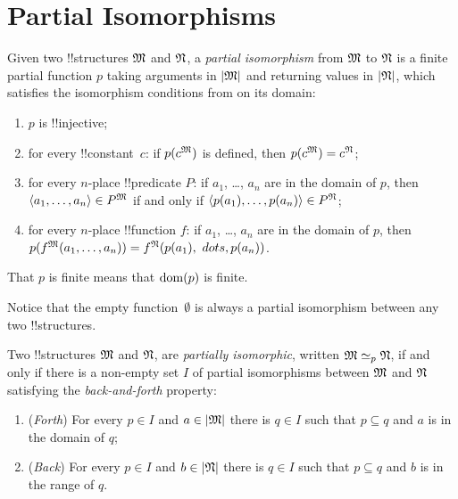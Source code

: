 \documentclass[../../../include/open-logic-section]{subfiles}
\begin{document}
\section{Partial Isomorphisms}

\begin{defn}
  Given two !!{structure}s $\mathfrak M$ and $\mathfrak N$, a
  \emph{partial isomorphism} from $\mathfrak M$ to $\mathfrak N$ is a
  finite partial function $p$ taking arguments in $\left| \mathfrak M \right|$ and returning
  values in $\left| \mathfrak N \right|$, which satisfies the isomorphism conditions from
   on its domain:
  \begin{enumerate}
  \item $p$ is !!{injective};
  \item for every !!{constant}~$c$: if $p(c^{\mathfrak M})$ is defined,
    then $p(c^{\mathfrak M}) = c^{\mathfrak N}$;
  \item for every $n$-place !!{predicate} $P$: if $a_1$, \dots, $a_n$
    are in the domain of $p$, then $\langle a_1, \dots, a_n\rangle \in
    P^{\mathfrak M}$ if and only if $\langle p(a_1), \dots, p(a_n) \rangle
    \in P^{\mathfrak N}$;
  \item for every $n$-place !!{function} $f$: if $a_1$, \dots, $a_n$
    are in the domain of $p$, then $p(f^{\mathfrak M} (a_1, \dots,a_n))
    = f^{\mathfrak N} (p(a_1), \ dots, p(a_n))$.
  \end{enumerate}
  That $p$ is finite means that $\mathrm{dom}(p)$ is finite.
\end{defn}

Notice that the empty function~$\emptyset$ is always a partial
isomorphism between any two !!{structure}s.

\begin{defn}
  Two !!{structure}s $\mathfrak M$ and $\mathfrak N$, are
  \emph{partially isomorphic}, written $\Struct{M} \iso[p]
  \Struct{N}$, if and only if there is a non-empty set $I$
  of partial isomorphisms between $\mathfrak M$ and $\mathfrak N$
  satisfying the \emph{back-and-forth} property:
  \begin{enumerate}
  \item (\emph{Forth}) For every $p \in I$ and $a \in \left| \mathfrak M \right|$
    there is $q \in I$ such that $p \subseteq q$ and $a$ is
    in the domain of $q$;
  \item (\emph{Back}) For every $p \in I$ and $b \in \left| \mathfrak N \right|$
    there is $q \in I$ such that $p \subseteq q$ and $b$ is
    in the range of $q$.
  \end{enumerate}
\end{defn}
\end{document}
